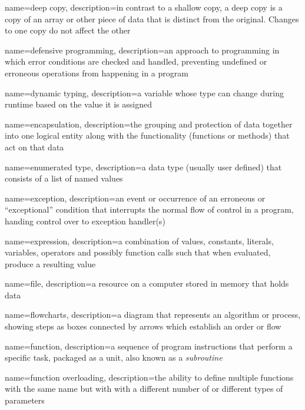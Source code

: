 {
  name=deep copy,
  description={in contrast to a shallow copy, a deep copy is a copy of an array or other piece of data that is distinct from the original.  Changes to one copy do not affect the other}
}

{
  name=defensive programming,
  description={an approach to programming in which error conditions are checked and handled, preventing undefined or
  	erroneous operations from happening in a program}
}

{
  name=dynamic typing,
  description={a variable whose type can change during runtime based on the value it is assigned}
}

{
  name=encapsulation,
  description={the grouping and protection of data together into one logical entity along with the functionality (functions or methods)
  	that act on that data}
}

{
  name=enumerated type,
  description={a data type (usually user defined) that consists of a list of named values}
}

{
  name=exception,
  description={an event or occurrence of an erroneous or ``exceptional'' condition that interrupts the normal flow of control in a program, handing control over to exception handler(s)}
}

{
  name=expression,
  description={a combination of values, constants, literals, variables, operators and possibly function calls such that when evaluated, produce a resulting value}
}

{
  name=file,
  description={a resource on a computer stored in memory that holds data}
}

{
  name=flowcharts,
  description={a diagram that represents an algorithm or process, showing steps as boxes connected by arrows which establish an
  order or flow}
}

{
  name=function,
  description={a sequence of program instructions that perform a specific task, packaged as a unit, also
  known as a \emph{subroutine}}
}

{
  name=function overloading,
  description={the ability to define multiple functions with the same name but with with a different number of or different types of parameters}
}

